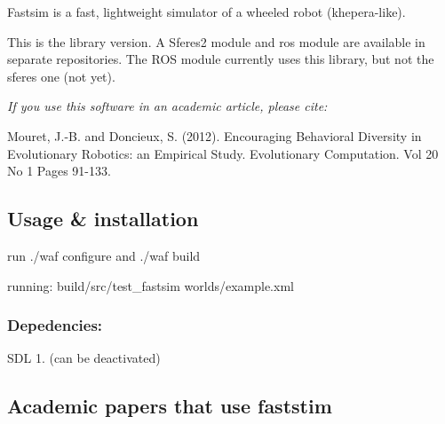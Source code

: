 Fastsim is a fast, lightweight simulator of a wheeled robot (khepera-\/like).

This is the library version. A Sferes2 module and ros module are available in separate repositories. The R\+OS module currently uses this library, but not the sferes one (not yet).

{\itshape If you use this software in an academic article, please cite\+:}

Mouret, J.-\/B. and Doncieux, S. (2012). Encouraging Behavioral Diversity in Evolutionary Robotics\+: an Empirical Study. Evolutionary Computation. Vol 20 No 1 Pages 91-\/133.

\subsection*{Usage \& installation }


\begin{DoxyItemize}
\item run {\ttfamily ./waf configure} and {\ttfamily ./waf build}
\item running\+: {\ttfamily build/src/test\+\_\+fastsim worlds/example.\+xml}
\end{DoxyItemize}

\subsubsection*{Depedencies\+:}


\begin{DoxyItemize}
\item S\+DL 1. (can be deactivated)
\end{DoxyItemize}

\subsection*{Academic papers that use faststim }


